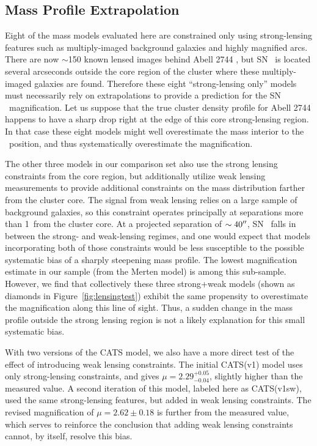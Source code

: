 \subsection{Mass Profile Extrapolation}
\label{sec:MassProfileExtrapolation}

Eight of the mass models evaluated here are constrained only using
strong-lensing features such as multiply-imaged background galaxies
and highly magnified arcs.  There are now $\sim$150 known lensed
images behind Abell 2744 \citep{Jauzac:2014c}, but SN \tomas\ is
located several arcseconds outside the core region of the cluster
where these multiply-imaged galaxies are found.  Therefore these eight
``strong-lensing only'' models must necessarily rely on extrapolations
to provide a prediction for the SN \tomas\ magnification.  Let us
suppose that the true cluster density profile for Abell 2744 happens
to have a sharp drop right at the edge of this core strong-lensing
region. In that case these eight models might well overestimate the
mass interior to the \tomas\ position, and thus systematically
overestimate the magnification.

The other three models in our comparison set also use the strong
lensing constraints from the core region, but additionally utilize
weak lensing measurements to provide additional constraints on the
mass distribution farther from the cluster core.  The signal from weak
lensing relies on a large sample of background galaxies, so this
constraint operates principally at separations more than 1\arcmin\
from the cluster core.  At a projected separation of $\sim40^{\prime\prime}$,
SN \tomas\ falls in between the strong- and weak-lensing regimes, and
one would expect that models incorporating both of those constraints
would be less susceptible to the possible systematic bias of
a sharply steepening mass profile.  The lowest magnification estimate
in our sample (from the Merten model) is among this sub-sample.
However, we find that collectively these three strong+weak models
(shown as diamonds in Figure~\ref{fig:lensingtest}) exhibit the same
propensity to overestimate the magnification along this line of sight.
Thus, a sudden change in the mass profile outside the strong lensing
region is not a likely explanation for this small systematic bias.

With two versions of the CATS model, we also have a more direct test
of the effect of introducing weak lensing constraints.  The initial
CATS(v1) model uses only strong-lensing constraints, and gives
$\mu=2.29^{+0.05}_{-0.04}$, slightly higher than the measured value.
A second iteration of this model, labeled here as CATS(v1sw), used the
same strong-lensing features, but added in weak lensing constraints.
The revised magnification of $\mu=2.62\pm0.18$ is further from the
measured value, which serves to reinforce the conclusion that adding
weak lensing constraints cannot, by itself, resolve this bias.


